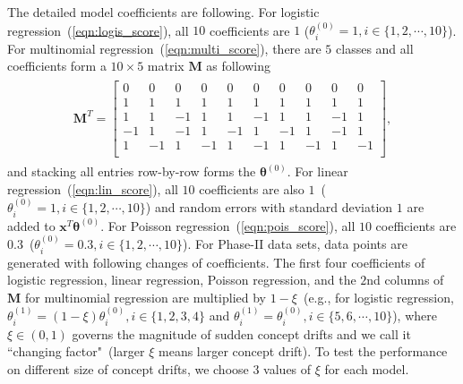 \documentclass[twoside,11pt]{article}
\begin{document}
\begin{appendices}
The detailed model coefficients are following. For logistic regression~(\ref{eqn:logis_score}), all $10$ coefficients are $1$ ($\theta_i^{(0)}=1, i\in\{1,2,\cdots,10\}$). For multinomial regression~(\ref{eqn:multi_score}), there are $5$ classes and all coefficients form a $10\times 5$ matrix $\mathbf{M}$ as following
\begin{align}
\begin{aligned}
\mathbf{M}^T = 
\begin{bmatrix}
0 & 0 & 0 & 0 & 0 & 0 & 0 & 0 & 0 & 0\\
1 & 1 & 1 & 1 & 1 & 1 & 1 & 1 & 1 & 1\\
1 & 1 & -1 & 1 & 1 & -1 & 1 & 1 & -1 & 1\\
-1 & 1 & -1 & 1 & -1 & 1 & -1 & 1 & -1 & 1\\
1 & -1 & 1 & -1 & 1 & -1 & 1 & -1 & 1 & -1\\
\end{bmatrix},
\end{aligned}
\end{align}
and stacking all entries row-by-row forms the $\bm{\theta}^{(0)}$.
For linear regression~(\ref{eqn:lin_score}), all $10$ coefficients are also $1$~($\theta_i^{(0)}=1, i\in\{1,2,\cdots,10\}$) and random errors with standard deviation $1$ are added to $\bm{x}^T\bm{\theta}^{(0)}$. For Poisson regression~(\ref{eqn:pois_score}), all $10$ coefficients are $0.3$~($\theta_i^{(0)}=0.3, i\in\{1,2,\cdots,10\}$). For Phase-II data sets, data points are generated with following changes of coefficients. The first four coefficients of logistic regression, linear regression, Poisson regression, and the $2$nd columns of $\mathbf{M}$ for multinomial regression are multiplied by $1-\xi$~(e.g., for logistic regression, $\theta_i^{(1)}=(1-\xi)\theta_i^{(0)}, i\in\{1,2,3,4\}$ and $\theta_i^{(1)}=\theta_i^{(0)}, i\in\{5,6,\cdots,10\}$), where $\xi\in(0,1)$ governs the magnitude of sudden concept drifts and we call it ``changing factor"~(larger $\xi$ means larger concept drift). To test the performance on different size of concept drifts, we choose $3$ values of $\xi$ for each model.


\end{appendices}
\end{document}
